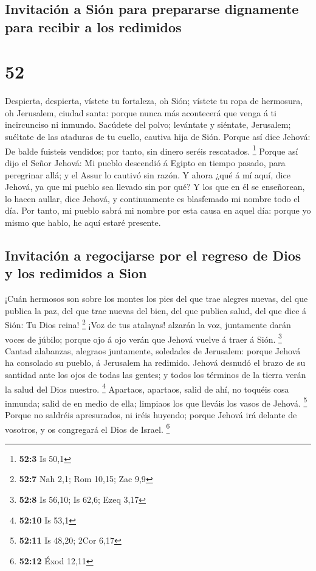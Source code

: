 \hypertarget{invitaciuxf3n-a-siuxf3n-para-prepararse-dignamente-para-recibir-a-los-redimidos}{%
\subsection{Invitación a Sión para prepararse dignamente para recibir a
los
redimidos}\label{invitaciuxf3n-a-siuxf3n-para-prepararse-dignamente-para-recibir-a-los-redimidos}}

\hypertarget{section-51}{%
\section{52}\label{section-51}}

 Despierta, despierta, vístete tu fortaleza, oh Sión;
vístete tu ropa de hermosura, oh Jerusalem, ciudad santa: porque nunca
más acontecerá que venga á ti incircunciso ni inmundo. 
Sacúdete del polvo; levántate y siéntate, Jerusalem; suéltate de las
ataduras de tu cuello, cautiva hija de Sión.  Porque así
dice Jehová: De balde fuisteis vendidos; por tanto, sin dinero seréis
rescatados. \footnote{\textbf{52:3} Is 50,1}  Porque así
dijo el Señor Jehová: Mi pueblo descendió á Egipto en tiempo pasado,
para peregrinar allá; y el Assur lo cautivó sin razón.  Y
ahora ¿qué á mí aquí, dice Jehová, ya que mi pueblo sea llevado sin por
qué? Y los que en él se enseñorean, lo hacen aullar, dice Jehová, y
continuamente es blasfemado mi nombre todo el día.  Por
tanto, mi pueblo sabrá mi nombre por esta causa en aquel día: porque yo
mismo que hablo, he aquí estaré presente.

\hypertarget{invitaciuxf3n-a-regocijarse-por-el-regreso-de-dios-y-los-redimidos-a-sion}{%
\subsection{Invitación a regocijarse por el regreso de Dios y los
redimidos a
Sion}\label{invitaciuxf3n-a-regocijarse-por-el-regreso-de-dios-y-los-redimidos-a-sion}}

 ¡Cuán hermosos son sobre los montes los pies del que trae
alegres nuevas, del que publica la paz, del que trae nuevas del bien,
del que publica salud, del que dice á Sión: Tu Dios reina! \footnote{\textbf{52:7}
  Nah 2,1; Rom 10,15; Zac 9,9}  ¡Voz de tus atalayas!
alzarán la voz, juntamente darán voces de júbilo; porque ojo á ojo verán
que Jehová vuelve á traer á Sión. \footnote{\textbf{52:8} Is 56,10; Is
  62,6; Ezeq 3,17}  Cantad alabanzas, alegraos juntamente,
soledades de Jerusalem: porque Jehová ha consolado su pueblo, á
Jerusalem ha redimido.  Jehová desnudó el brazo de su
santidad ante los ojos de todas las gentes; y todos los términos de la
tierra verán la salud del Dios nuestro. \footnote{\textbf{52:10} Is 53,1}
 Apartaos, apartaos, salid de ahí, no toquéis cosa inmunda;
salid de en medio de ella; limpiaos los que lleváis los vasos de Jehová.
\footnote{\textbf{52:11} Is 48,20; 2Cor 6,17}  Porque no
saldréis apresurados, ni iréis huyendo; porque Jehová irá delante de
vosotros, y os congregará el Dios de Israel. \footnote{\textbf{52:12}
  Éxod 12,11}

